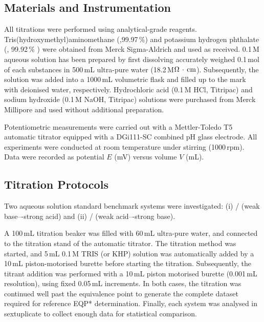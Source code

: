 \documentclass[twoside,twocolumn,9pt]{article}
\begin{document}
\subsection*{Materials and Instrumentation}

All titrations were performed using analytical-grade reagents.
Tris(hydroxymethyl)aminomethane (,99.97\,\%) and potassium hydrogen phthalate (, 99.92\,\% ) were obtained from Merck Sigma-Aldrich and used as received.
0.1\,M aqueous solution has been prepared by first dissolving accurately weighed 0.1\,mol of each substances in 500\,mL ultra-pure water (18.2\,M$\Omega\,\cdot\,{\rm cm}$). Subsequently, the solution was added into a 1000\,mL volumetric flask and filled up to the mark with deionised water, respectively. Hydrochloric acid (0.1\,M HCl, Titripac) and sodium hydroxide (0.1\,M NaOH, Titripac) solutions were purchased from Merck Millipore and used without additional preparation. 

Potentiometric measurements were carried out with a Mettler-Toledo T5 automatic titrator equipped with a DGi111-SC combined pH glass electrode.
All experiments were conducted at room temperature under stirring (1000\,rpm). Data were recorded as potential $E$ (mV) versus volume $V$ (mL). %

\subsection*{Titration Protocols}

Two aqueous solution standard benchmark systems were investigated: (i) / (weak base–-strong acid) and (ii) / (weak acid–-strong base).

A 100\,mL titration beaker was filled with 60\,mL ultra-pure water, and connected to the titration stand of the automatic titrator. The titration method was started, and 5\,mL 0.1\,M TRIS (or KHP) solution was automatically added by a 10\,mL piston-motorised burette before starting the titration. Subsequently, the titrant addition was performed with a 10\,mL piston motorised burette (0.001\,mL resolution), using fixed 0.05\,mL increments.
In both cases, the titration was continued well past the equivalence point %
to generate the complete dataset required for reference EQP* determination.%
Finally, each system was analysed in sextuplicate to collect enough data for statistical comparison.
\end{document}
